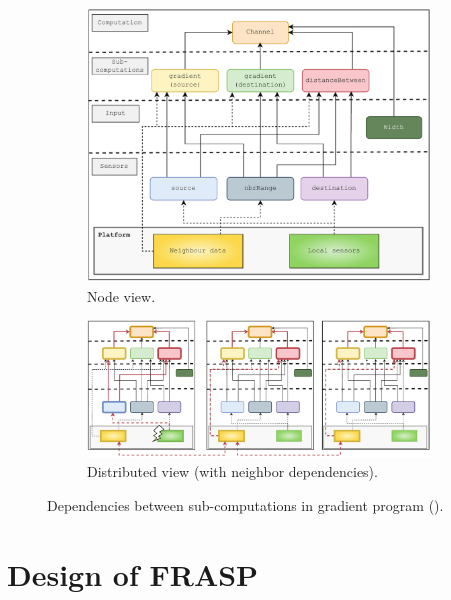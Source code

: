 \begin{figure}
    \centering
    \begin{subfigure}[b]{\textwidth}
        \centering
        \includegraphics[width=\textwidth]{figures/gradient-dependencies.png}
        \caption{Node view.}
        \label{fig:gradient-dependencies}
    \end{subfigure}
    \hfill
    \begin{subfigure}[b]{\textwidth}
        \centering
        \includegraphics[width=\textwidth]{figures/gradient-dependencies-distributed.png}
        \caption{Distributed view (with neighbor dependencies).}
        \label{fig:gradient-dependencies-distributed}
    \end{subfigure}
    \caption{Dependencies between sub-computations in gradient program ().}
\end{figure}

\section{Design of FRASP}
\label{section:design-of-frasp}

